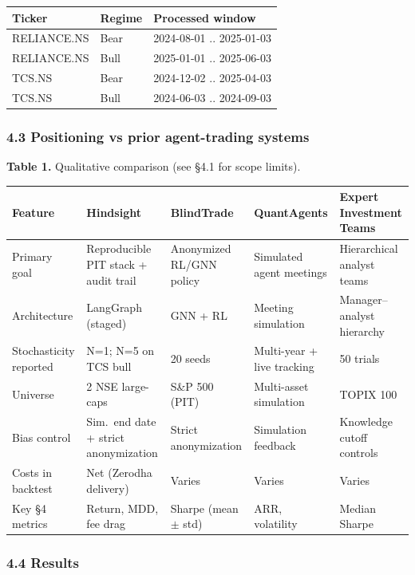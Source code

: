 \documentclass{article}
\begin{document}
\medskip
{\small
\begin{tabular}{@{} l l l @{}}
\toprule
Ticker & Regime & Processed window \\
\midrule
RELIANCE.NS & Bear & 2024-08-01 .. 2025-01-03 \\
\addlinespace
RELIANCE.NS & Bull & 2025-01-01 .. 2025-06-03 \\
\addlinespace
TCS.NS & Bear & 2024-12-02 .. 2025-04-03 \\
\addlinespace
TCS.NS & Bull & 2024-06-03 .. 2024-09-03 \\
\bottomrule
\end{tabular}
}

\subsubsection{4.3 Positioning vs prior agent-trading systems}\label{positioning-vs-prior-agent-trading-systems}

\textbf{Table 1.} Qualitative comparison (see §4.1 for scope limits).

{\small
\begin{tabularx}{\linewidth}{@{} X X X X X @{}}
\toprule
Feature & Hindsight & BlindTrade & QuantAgents & Expert Investment Teams \\
\midrule
Primary goal &
  Reproducible PIT stack + audit trail &
  Anonymized RL/GNN policy &
  Simulated agent meetings &
  Hierarchical analyst teams \\
\addlinespace
Architecture &
  LangGraph (staged) &
  GNN + RL &
  Meeting simulation &
  Manager--analyst hierarchy \\
\addlinespace
Stochasticity reported &
  N=1; N=5 on TCS bull &
  20 seeds &
  Multi-year + live tracking &
  50 trials \\
\addlinespace
Universe &
  2 NSE large-caps &
  S\&P 500 (PIT) &
  Multi-asset simulation &
  TOPIX 100 \\
\addlinespace
Bias control &
  Sim.\ end date + strict anonymization &
  Strict anonymization &
  Simulation feedback &
  Knowledge cutoff controls \\
\addlinespace
Costs in backtest &
  Net (Zerodha delivery) &
  Varies &
  Varies &
  Varies \\
\addlinespace
Key \S4 metrics &
  Return, MDD, fee drag &
  Sharpe (mean $\pm$ std) &
  ARR, volatility &
  Median Sharpe \\
\bottomrule
\end{tabularx}
}

\subsubsection{4.4 Results}\label{results}
\end{document}
